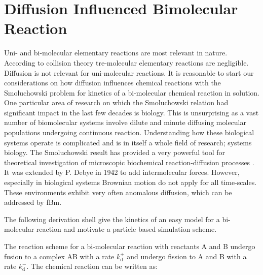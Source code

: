\documentclass[
  a4paper,BCOR10mm,oneside,
  headsepline,footsepline,%
  fleqn,openbib
]{scrbook}
\begin{document}
% 
% 
% 
% 

\section{Diffusion Influenced Bimolecular Reaction}\label{Erban-chapman-section}
Uni- and bi-molecular elementary reactions are most relevant in nature. According to collision theory tre-molecular elementary reactions are negligible. Diffusion is not relevant for uni-molecular reactions. It is reasonable to start our considerations on how diffusion influences chemical reactions with the Smoluchowski problem for kinetics of a bi-molecular chemical reaction in solution. One particular area of research on which the Smoluchowski relation had significant impact in the last few decades is biology. This is unsurprising as a vast number of biomolecular systems involve dilute and minute diffusing molecular populations undergoing continuous reaction. Understanding how these biological systems operate is complicated and is in itself a whole field of research; systems biology. The Smoluchowski result has provided a very powerful tool for theoretical investigation of microscopic biochemical reaction-diffusion processes \cite{Flegg}. It was extended by P. Debye in 1942 to add intermolecular forces. However, especially in biological systems Brownian motion do not apply for all time-scales. These environments exhibit very often anomalous diffusion, which can be addressed by fBm. 
\par
The following derivation shell give the kinetics of an easy model for a bi-molecular reaction and motivate a particle based simulation scheme.\par 
The reaction scheme for a bi-molecular reaction with reactants A and B undergo fusion to a complex AB with a rate $k^{+}_{\mathrm{d}}$ and undergo fission to A and B with a rate $k^{-}_{\mathrm{d}}$. The chemical reaction can be written as:
\end{document}
